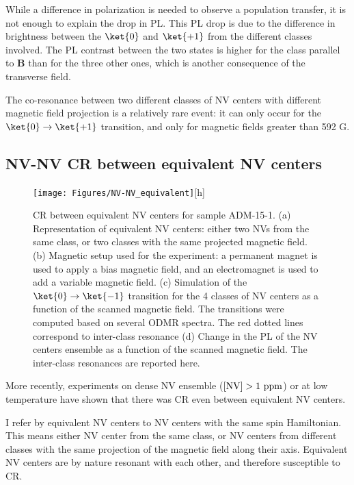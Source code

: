 \documentclass[a4paper,11pt]{report}
\begin{document}
While a difference in polarization is needed to observe a population transfer, it is not enough to explain the drop in PL. This PL drop is due to the difference in brightness between the $\ket{0}$ and $\ket{+1}$ from the different classes involved. The PL contrast between the two states is higher for the class parallel to $\mathbf{B}$ than for the three other ones, which is another consequence of the transverse field.

The co-resonance between two different classes of NV centers with different magnetic field projection is a relatively rare event: it can only occur for the $\ket{0} \to \ket{+1}$ transition, and only for magnetic fields greater than 592 G.


\subsection{NV-NV CR between equivalent NV centers}

\begin{figure}[h]
\centering
\texttt{[image: Figures/NV-NV\_equivalent]}[h]
\caption{CR between equivalent NV centers for sample ADM-15-1. (a) Representation of equivalent NV centers: either two NVs from the same class, or two classes with the same projected magnetic field. (b) Magnetic setup used for the experiment: a permanent magnet is used to apply a bias magnetic field, and an electromagnet is used to add a variable magnetic field. (c) Simulation of the $\ket{0}\to\ket{-1}$ transition for the 4 classes of NV centers as a function of the scanned magnetic field. The transitions were computed based on several ODMR spectra. The red dotted lines correspond to inter-class resonance (d) Change in the PL of the NV centers ensemble as a function of the scanned magnetic field. The inter-class resonances are reported here.}
\label{equivalent NV-NV}
\end{figure}

More recently, experiments \citep{jarmola2012temperature, mrozek2015longitudinal, choi2017depolarization} on dense NV ensemble ($[\rm NV ] >1\ \rm ppm$) or at low temperature have shown that there was CR even between equivalent NV centers.

I refer by equivalent NV centers to NV centers with the same spin Hamiltonian. This means either NV center from the same class, or NV centers from different classes with the same projection of the magnetic field along their axis. Equivalent NV centers are by nature resonant with each other, and therefore susceptible to CR.
\end{document}
